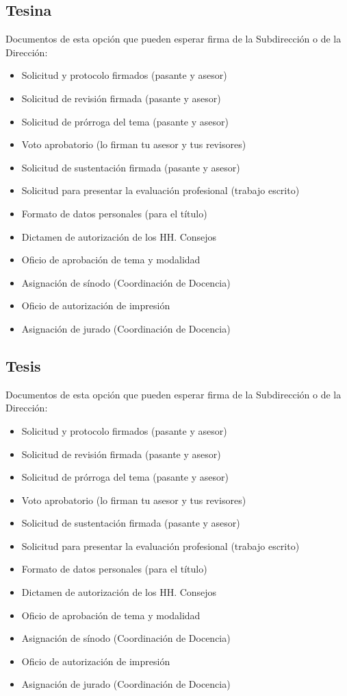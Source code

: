 \subsection{Tesina}
Documentos de esta opción que pueden esperar firma de la Subdirección o de la Dirección:
\begin{itemize}
  \item Solicitud y protocolo firmados (pasante y asesor)
  \item Solicitud de revisión firmada (pasante y asesor)
  \item Solicitud de prórroga del tema (pasante y asesor)
  \item Voto aprobatorio (lo firman tu asesor y tus revisores)
  \item Solicitud de sustentación firmada (pasante y asesor)
  \item Solicitud para presentar la evaluación profesional (trabajo escrito)
  \item Formato de datos personales (para el título)
  \item Dictamen de autorización de los HH. Consejos
  \item Oficio de aprobación de tema y modalidad
  \item Asignación de sínodo (Coordinación de Docencia)
  \item Oficio de autorización de impresión
  \item Asignación de jurado (Coordinación de Docencia)
\end{itemize}
\subsection{Tesis}
Documentos de esta opción que pueden esperar firma de la Subdirección o de la Dirección:
\begin{itemize}
  \item Solicitud y protocolo firmados (pasante y asesor)
  \item Solicitud de revisión firmada (pasante y asesor)
  \item Solicitud de prórroga del tema (pasante y asesor)
  \item Voto aprobatorio (lo firman tu asesor y tus revisores)
  \item Solicitud de sustentación firmada (pasante y asesor)
  \item Solicitud para presentar la evaluación profesional (trabajo escrito)
  \item Formato de datos personales (para el título)
  \item Dictamen de autorización de los HH. Consejos
  \item Oficio de aprobación de tema y modalidad
  \item Asignación de sínodo (Coordinación de Docencia)
  \item Oficio de autorización de impresión
  \item Asignación de jurado (Coordinación de Docencia)
\end{itemize}
